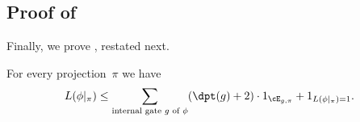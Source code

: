 \documentclass{toc}
\begin{document}
\subsection{\label{subsec:reduction-to-size-2-with-substitution}Proof of }

Finally, we prove ,
restated next.
\begin{restated}{}
For every projection~$\pi$ we have 
\begin{equation}
L(\phi|_{\pi})\le\sum_{\text{internal gate \ensuremath{g} of \ensuremath{\phi}}}(\dpt(g)+2)\cdot1_{\cE_{g,\pi}}+1_{L(\phi|_{\pi})=1}.\label{eq:reduction-to-size-2-with-substitution}
\end{equation}
\end{restated}
\end{document}
